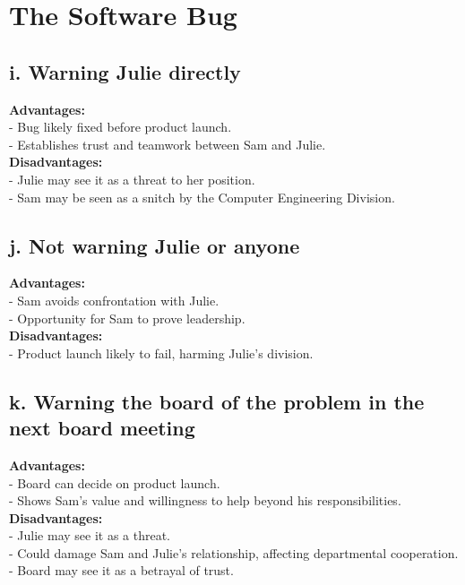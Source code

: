 \documentclass{article}
\begin{document}
\pagebreak
\section{The Software Bug}

\subsection{i. Warning Julie directly}
\textbf{Advantages:} \\
- Bug likely fixed before product launch. \\
- Establishes trust and teamwork between Sam and Julie. \\

\textbf{Disadvantages:} \\
- Julie may see it as a threat to her position. \\
- Sam may be seen as a snitch by the Computer Engineering Division. \\

\subsection{j. Not warning Julie or anyone}
\textbf{Advantages:} \\
- Sam avoids confrontation with Julie. \\
- Opportunity for Sam to prove leadership. \\

\textbf{Disadvantages:} \\
- Product launch likely to fail, harming Julie's division. \\

\subsection{k. Warning the board of the problem in the next board meeting}
\textbf{Advantages:} \\
- Board can decide on product launch. \\
- Shows Sam's value and willingness to help beyond his responsibilities. \\

\textbf{Disadvantages:} \\
- Julie may see it as a threat. \\
- Could damage Sam and Julie's relationship, affecting departmental cooperation. \\
- Board may see it as a betrayal of trust. \\
\end{document}
